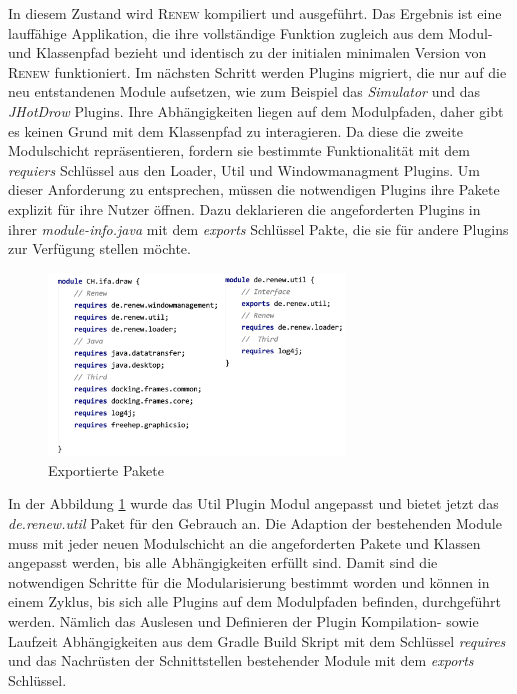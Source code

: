 	In diesem Zustand wird \textsc{Renew} kompiliert und ausgeführt. Das Ergebnis ist eine lauffähige Applikation, die ihre vollständige Funktion zugleich aus dem Modul- und Klassenpfad bezieht und identisch zu der initialen minimalen Version von \textsc{Renew} funktioniert.\newline
	Im nächsten Schritt werden Plugins migriert, die nur auf die neu entstandenen Module aufsetzen, wie zum Beispiel das \textit{Simulator} und das \textit{JHotDrow} Plugins. Ihre Abhängigkeiten liegen auf dem Modulpfaden, daher gibt es keinen Grund mit dem Klassenpfad zu interagieren. \newline
	Da diese die zweite Modulschicht repräsentieren, fordern sie bestimmte Funktionalität mit dem \textit{requiers} Schlüssel aus den Loader, Util und Windowmanagment Plugins. Um dieser Anforderung zu entsprechen, müssen die notwendigen Plugins ihre Pakete  explizit für ihre Nutzer öffnen. Dazu deklarieren die angeforderten Plugins in ihrer \textit{module-info.java} mit dem \textit{exports} Schlüssel Pakte, die sie für andere Plugins zur Verfügung stellen möchte.

	\begin{figure}[h!]
	  \centering
	  \includegraphics[width=0.7\textwidth]{material/images/utilCH-info.png}
	  \caption{Exportierte Pakete}
	  \label{fig:utilCH}
	\end{figure}

	In der Abbildung \ref{fig:utilCH} wurde das Util Plugin Modul angepasst und bietet jetzt das \textit{de.renew.util} Paket für den Gebrauch an.\newline
	Die Adaption der bestehenden Module muss mit jeder neuen Modulschicht an die angeforderten Pakete und Klassen angepasst werden, bis alle Abhängigkeiten erfüllt sind.\newline
	Damit sind die notwendigen Schritte für die Modularisierung bestimmt worden und können in einem Zyklus, bis sich alle Plugins auf dem Modulpfaden befinden, durchgeführt werden. Nämlich das Auslesen und Definieren der Plugin Kompilation- sowie Laufzeit Abhängigkeiten aus dem Gradle Build Skript mit dem Schlüssel \textit{requires} und das Nachrüsten der Schnittstellen bestehender Module mit dem \textit{exports} Schlüssel. \bigbreak

